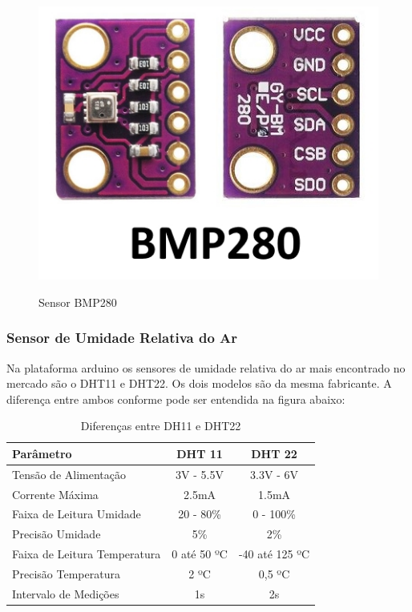 \begin{figure} [!h]
    \centering
    \caption{Sensor BMP280}
    \includegraphics[scale=0.5]{Figuras/BMP280_Pinout.jpg}
    \label{fig:bmp280}
\end{figure}

\subsubsection{Sensor de Umidade Relativa do Ar}

Na plataforma arduino os sensores de umidade relativa do ar mais encontrado no mercado são o DHT11 e DHT22. Os dois modelos são da mesma fabricante. A diferença entre ambos conforme \cite{AutoCoreBlog} pode ser entendida na figura abaixo:

\begin{table}[!h]
\centering
\begin{tabular}{|l|c|c|}
\hline
\textbf{Parâmetro}           & \textbf{DHT 11} & \textbf{DHT 22} \\ \hline
Tensão de Alimentação        & 3V - 5.5V       & 3.3V - 6V       \\ \hline
Corrente Máxima              & 2.5mA           & 1.5mA           \\ \hline
Faixa de Leitura Umidade     & 20 - 80\%       & 0 - 100\%       \\ \hline
Precisão Umidade             & 5\%             & 2\%             \\ \hline
Faixa de Leitura Temperatura & 0 até 50 ºC     & -40 até 125 ºC  \\ \hline
Precisão Temperatura         & 2 ºC            & 0,5 ºC          \\ \hline
Intervalo de Medições        & 1s              & 2s              \\ \hline
\end{tabular}
\caption{Diferenças entre DH11 e DHT22}
\label{tab:dhtsensor}
\end{table}

